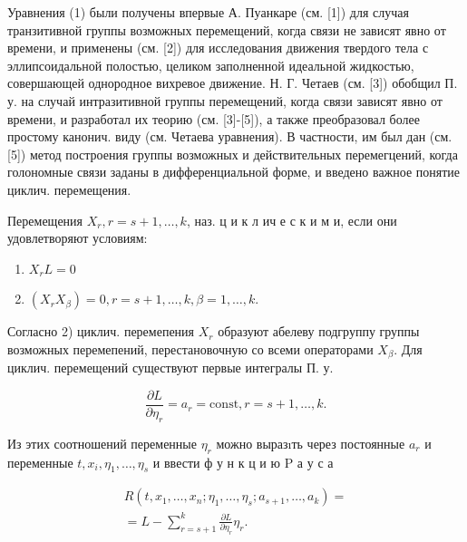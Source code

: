\documentclass[10pt]{article}
\begin{document}
Уравнения (1) были получены впервые А. Пуанкаре (см. [1]) для случая транзитивной группы возможных перемещений, когда связи не зависят явно от времени, и применены (см. [2]) для исследования движения твердого тела с эллипсоидальной полостью, целиком заполненной идеальной жидкостью, совершающей однородное вихревое движение. Н. Г. Четаев (см. [3]) обобщил П. у. на случай интразитивной группы перемещений, когда связи зависят явно от времени, и разработал их теорию (см. [3]-[5]), а также преобразовал более простому канонич. виду (см. Четаева уравнения). В частности, им был дан (см. [5]) метод построения группы возможных и действительных перемегцений, когда голономные связи заданы в дифференциальной форме, и введено важное понятие циклич. перемещения.



Перемещения $X_{r}, r=s+1, \ldots, k$, наз. ц и к л ич е с к и м и, если они удовлетворяют условиям:



\begin{enumerate}

  \item $X_{r} L=0$



  \item $\left(X_{r} X_{\beta}\right)=0, r=s+1, \ldots, k, \beta=1, \ldots, k$.



\end{enumerate}



Согласно 2) циклич. перемепения $X_{r}$ образуют абелеву подгруппу группы возможных перемепений, перестановочную со всеми операторами $X_{\beta}$. Для циклич. перемещений существуют первые интегралы П. у.



\[

\frac{\partial L}{\partial \eta_{r}}=a_{r}=\mathrm{const}, r=s+1, \ldots, k .

\]



Из этих соотношений переменные $\eta_{r}$ можно выразıть через постоянные $a_{r}$ и переменные $t, x_{i}, \eta_{1}, \ldots, \eta_{s}$ и ввести ф у н к ц и ю $\mathrm{P}$ а у с а



\[

\begin{gathered}

R\left(t, x_{1}, \ldots, x_{n} ; \eta_{1}, \ldots, \eta_{s} ; a_{s+1}, \ldots, a_{k}\right)= \\

=L-\sum_{r=s+1}^{k} \frac{\partial L}{\partial \eta_{r}} \eta_{r} .

\end{gathered}

\]
\end{document}
